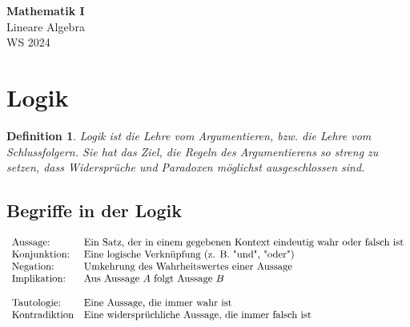 \documentclass[11pt]{article}
\begin{document}
\thispagestyle{empty}

\newtheorem{definition}{Definition}[section]

\newcommand{\ol}[1]{\begin{enumerate}#1\end{enumerate}}
\newcommand{\ul}[1]{\begin{itemize}#1\end{itemize}}
\newcommand{\li}[1]{\item{#1}}
\newcommand{\equivto}{\Longleftrightarrow}

\newcommand{\N}{\mathbb{N}}
\newcommand{\Z}{\mathbb{Z}}

\begin{center}
  {\LARGE \bf Mathematik I}\\
  {\Large Lineare Algebra}\\
  WS 2024
\end{center}

\section{Logik}
\begin{definition}
  Logik ist die \textit{Lehre vom Argumentieren}, bzw. die \textit{Lehre vom Schlussfolgern}.
  Sie hat das Ziel, die Regeln des Argumentierens so streng zu setzen, dass Widersprüche und Paradoxen möglichst
  ausgeschlossen sind.
\end{definition}
\subsection{Begriffe in der Logik}
$
  \begin{array}{l l}
    \text{Aussage:}      & \text{Ein Satz, der in einem gegebenen Kontext eindeutig wahr oder falsch ist} \\
    \text{Konjunktion:}  & \text{Eine logische Verknüpfung (z. B. "und", "oder")}                         \\
    \text{Negation:}     & \text{Umkehrung des Wahrheitswertes einer Aussage}                             \\
    \text{Implikation:}  & \text{Aus Aussage $A$ folgt Aussage $B$}                                       \\\\
    \text{Tautologie:}   & \text{Eine Aussage, die immer wahr ist}                                        \\
    \text{Kontradiktion} & \text{Eine widersprüchliche Aussage, die immer falsch ist}                     \\
  \end{array}
$
\end{document}
